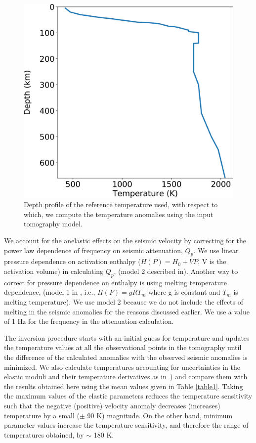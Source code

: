 \documentclass[draft,linenumbers]{agujournal2018}
\begin{document}
\begin{figure}[ht]
    \centering
    \includegraphics[width=0.5\linewidth]{figures/temperature_reference.png}
    \caption{Depth profile of the reference temperature used, with respect to which, we compute the temperature anomalies using the input tomography model.}
    \label{fig_refT}
\end{figure}

We account for the anelastic effects on the seismic velocity by correcting for the power law dependence of frequency on seismic attenuation, $Q_p$. We use linear pressure dependence on activation enthalpy ($H(P)= H_0 + VP$, V is the activation volume) in calculating $Q_p$, (model 2 described in\citet{sobolev1996upper}). Another way to correct for pressure dependence on enthalpy is using melting temperature dependence, (model 1 in \citet{sobolev1996upper}, i.e., $H(P)= gRT_m$ where g is constant and $T_m$ is melting temperature). We use model 2 because we do not include the effects of melting in the seismic anomalies for the reasons discussed earlier. We use a value of 1 Hz for the frequency in the attenuation calculation.

The inversion procedure starts with an initial guess for temperature and updates the temperature values at all the observational points in the tomography until the difference of the calculated anomalies with the observed seismic anomalies is minimized. We also calculate temperatures accounting for uncertainties in the elastic moduli and their temperature derivatives as in~\citep{Cammarano2003}) and compare them with the results obtained here using the mean values given in Table \ref{table1}. Taking the maximum values of the elastic parameters reduces the temperature sensitivity such that the negative (positive) velocity anomaly decreases (increases) temperature by a small ($\pm$ 90 K) magnitude. On the other hand, minimum parameter values increase the temperature sensitivity, and therefore the range of temperatures obtained, by $\sim$ 180 K.
\end{document}
